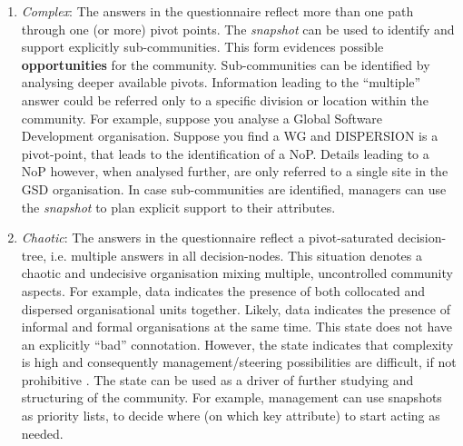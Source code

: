 \begin{enumerate}
\item \emph{Complex}: The answers in the questionnaire reflect more than one path through one (or more) pivot points. The \emph{snapshot} can be used to identify and support explicitly sub-communities. This form evidences possible \textbf{opportunities} for the community. Sub-communities can be identified by analysing deeper available pivots. Information leading to the ``multiple'' answer could be referred only to a specific division or location within the community. For example, suppose you analyse a Global Software Development organisation. Suppose you find a WG and DISPERSION is a pivot-point, that leads to the identification of a NoP. Details leading to a NoP however, when analysed further, are only referred to a single site in the GSD organisation. In case sub-communities are identified, managers can use the \emph{snapshot} to plan explicit support to their attributes.

\item \emph{Chaotic}: The answers in the questionnaire reflect a pivot-saturated decision-tree, i.e. multiple answers in all decision-nodes. This situation denotes a chaotic and undecisive organisation mixing multiple, uncontrolled community aspects. For example, data indicates the presence of both collocated and dispersed organisational units together. Likely, data indicates the presence of informal and formal organisations at the same time. This state does not have an explicitly ``bad'' connotation. However, the state indicates that complexity is high and consequently management/steering possibilities are difficult, if not prohibitive \cite{chaosorg}. The state can be used as a driver of further studying and structuring of the community. For example, management can use snapshots as priority lists, to decide where (on which key attribute) to start acting as needed.

%
\end{enumerate}


